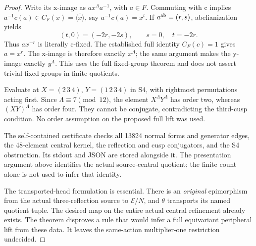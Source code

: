 \begin{proof}
Write its x-image as \(a x^\Lambda a^{-1}\), with \(a\in F\).
Commuting with c implies
\(a^{-1}c(a)\in C_F(x)=\overline{\langle x\rangle}\),
say \(a^{-1}c(a)=x^t\). If \(a^{\rm ab}=(r,s)\),
abelianization yields
\[
 (t,0)=(-2r,-2s),\qquad s=0,\quad t=-2r.
\]
Thus \(a x^{-r}\) is literally c-fixed. The established
full identity \(C_F(c)=1\) gives \(a=x^r\). The x-image
is therefore exactly \(x^\Lambda\); the same argument
makes the y-image exactly \(y^\Lambda\). This uses the full
fixed-group theorem and does not assert trivial fixed groups
in finite quotients.

Evaluate at \(X=(2\,3\,4)\), \(Y=(1\,2\,3\,4)\) in
S4, with rightmost permutations acting first. Since
\(\Lambda\equiv7\pmod {12}\), the element
\(X^\Lambda Y^\Lambda\) has order two, whereas
\((XY)^\Lambda\) has order four. They cannot be conjugate,
contradicting the third-cusp condition. No order assumption on
the proposed full lift was used.

The self-contained certificate
checks all 13824 normal forms and generator edges, the 48-element
central kernel, the reflection and cusp conjugators, and the S4
obstruction. Its stdout and JSON are stored alongside it. The
presentation argument above identifies the actual source-central
quotient; the finite count alone is not used to infer that identity.

The transported-head formulation is essential. There is an
\emph{original} epimorphism from the actual three-reflection
source to \(\mathcal E/N\), and \(\theta\) transports its named
quotient tuple. The desired map on the entire actual central
refinement already exists. The theorem disproves a rule that
would infer a full equivariant peripheral lift from these data.
It leaves the same-action multiplier-one restriction undecided.
\end{proof}

